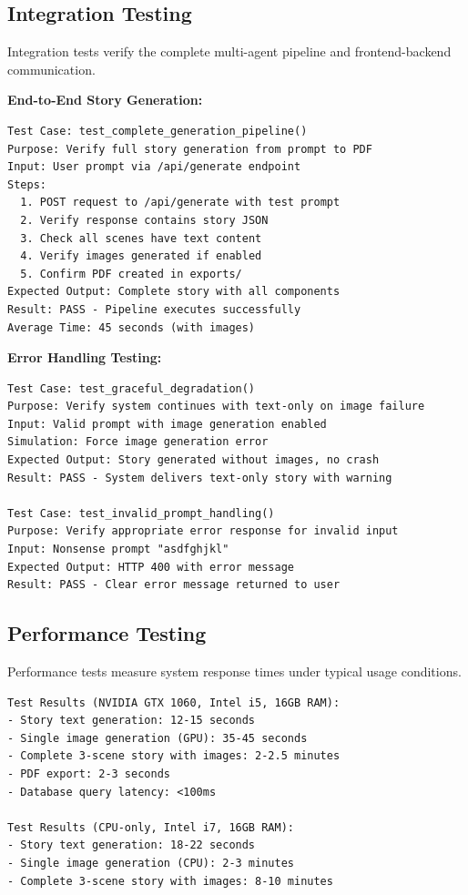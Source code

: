 \subsection{Integration Testing}

Integration tests verify the complete multi-agent pipeline and frontend-backend communication.

\textbf{End-to-End Story Generation:}

\begin{verbatim}
Test Case: test_complete_generation_pipeline()
Purpose: Verify full story generation from prompt to PDF
Input: User prompt via /api/generate endpoint
Steps:
  1. POST request to /api/generate with test prompt
  2. Verify response contains story JSON
  3. Check all scenes have text content
  4. Verify images generated if enabled
  5. Confirm PDF created in exports/
Expected Output: Complete story with all components
Result: PASS - Pipeline executes successfully
Average Time: 45 seconds (with images)
\end{verbatim}

\textbf{Error Handling Testing:}

\begin{verbatim}
Test Case: test_graceful_degradation()
Purpose: Verify system continues with text-only on image failure
Input: Valid prompt with image generation enabled
Simulation: Force image generation error
Expected Output: Story generated without images, no crash
Result: PASS - System delivers text-only story with warning

Test Case: test_invalid_prompt_handling()
Purpose: Verify appropriate error response for invalid input
Input: Nonsense prompt "asdfghjkl"
Expected Output: HTTP 400 with error message
Result: PASS - Clear error message returned to user
\end{verbatim}

\subsection{Performance Testing}

Performance tests measure system response times under typical usage conditions.

\begin{verbatim}
Test Results (NVIDIA GTX 1060, Intel i5, 16GB RAM):
- Story text generation: 12-15 seconds
- Single image generation (GPU): 35-45 seconds
- Complete 3-scene story with images: 2-2.5 minutes
- PDF export: 2-3 seconds
- Database query latency: <100ms

Test Results (CPU-only, Intel i7, 16GB RAM):
- Story text generation: 18-22 seconds
- Single image generation (CPU): 2-3 minutes
- Complete 3-scene story with images: 8-10 minutes
\end{verbatim}
